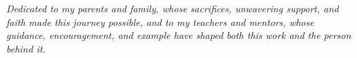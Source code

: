 \begin{center}
\textit{Dedicated to my parents and family, whose sacrifices, unwavering support, and faith made this journey possible, and to my teachers and mentors, whose guidance, encouragement, and example have shaped both this work and the person behind it.}
\end{center}
